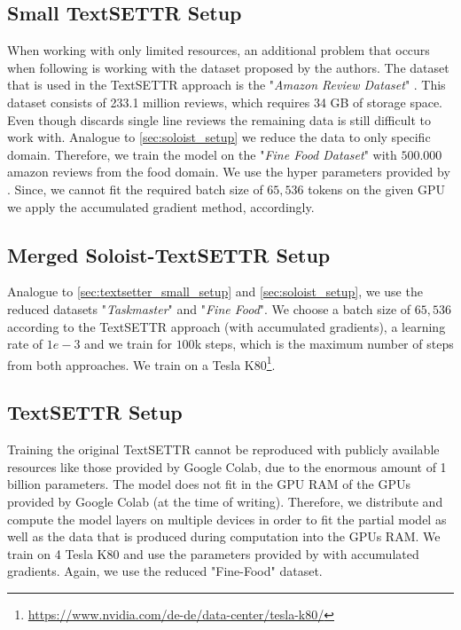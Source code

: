 \documentclass[twocolumn]{tum-article}
\begin{document}
\subsection{Small TextSETTR Setup}\label{sec:textsetter_small_setup}
When working with only limited resources, an additional problem that occurs when following \cite{riley2020textsettr} is working with the dataset proposed by the authors. The dataset that is used in the TextSETTR approach is the "\textit{Amazon Review Dataset}" \cite{ni2019justifying}. This dataset consists of 233.1 million reviews, which requires 34 GB of storage space. Even though \cite{riley2020textsettr} discards single line reviews the remaining data is still difficult to work with. Analogue to \autoref{sec:soloist_setup} we reduce the data to only specific domain. Therefore, we train the model on the "\textit{Fine Food Dataset}" \cite{mcauley2013amateurs} with $500.000$ amazon reviews from the food domain. We use the hyper parameters provided by \cite{riley2020textsettr}. Since, we cannot fit the required batch size of $65,536$ tokens on the given GPU we apply the accumulated gradient method, accordingly. 
\subsection{Merged Soloist-TextSETTR Setup}\label{sec:soloist_textsettr_setup}
Analogue to \autoref{sec:textsetter_small_setup} and \autoref{sec:soloist_setup}, we use the reduced datasets "\textit{Taskmaster}" and "\textit{Fine Food}". We choose a batch size of $65,536$ according to the TextSETTR approach (with accumulated gradients), a learning rate of $1e-3$ and we train for $100$k steps, which is the maximum number of steps from both approaches. We train on a Tesla K80\footnote{\url{https://www.nvidia.com/de-de/data-center/tesla-k80/}}.
\subsection{TextSETTR Setup}
Training the original TextSETTR cannot be reproduced with publicly available resources like those provided by Google Colab, due to the enormous amount of 1 billion parameters. The model does not fit in the GPU RAM of the GPUs provided by Google Colab (at the time of writing). Therefore, we distribute and compute the model layers on multiple devices in order to fit the partial model as well as the data that is produced during computation into the GPUs RAM. We train on 4 Tesla K80 and use the parameters provided by \cite{riley2020textsettr} with accumulated gradients. Again, we use the reduced "Fine-Food" dataset. 
\end{document}
